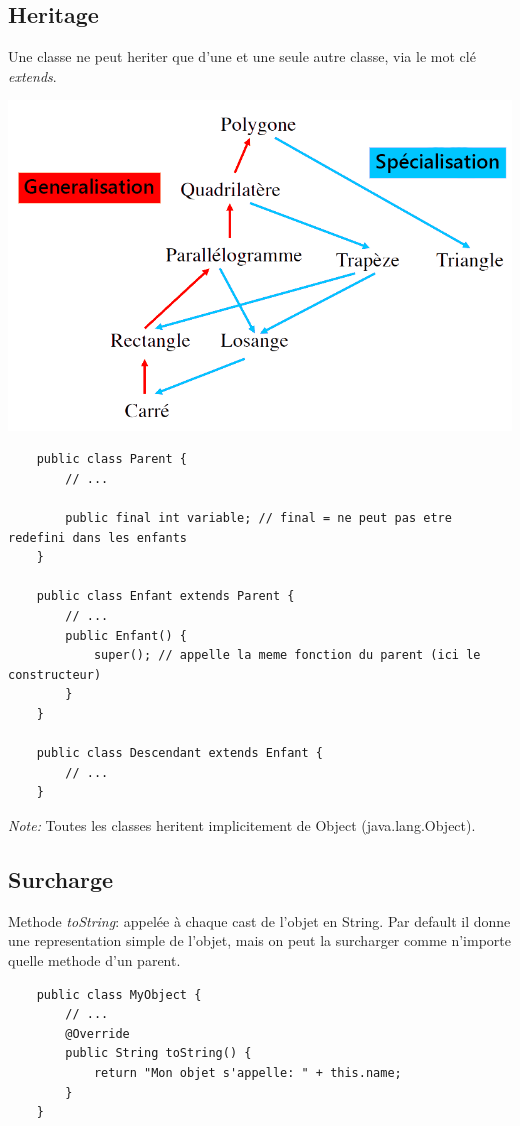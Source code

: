\documentclass[a4paper, 12pt, french]{article}
\begin{document}
	\subsection{Heritage}

	Une classe ne peut heriter que d'une et une seule autre classe, via le mot clé \emph{extends}.

	\includegraphics[width=13.8cm]{java_00_heritage}

	\begin{lstlisting}
	public class Parent {
		// ...

		public final int variable; // final = ne peut pas etre redefini dans les enfants
	}

	public class Enfant extends Parent {
		// ...
		public Enfant() {
			super(); // appelle la meme fonction du parent (ici le constructeur)
		}
	}

	public class Descendant extends Enfant {
		// ...
	}
	\end{lstlisting}

	\emph{Note:} Toutes les classes heritent implicitement de Object (java.lang.Object).\\

	\subsection{Surcharge}

	Methode \emph{toString}: appelée à chaque cast de l'objet en String. Par default il donne une representation simple de l'objet, mais on peut la surcharger comme n'importe quelle methode d'un parent.

	\begin{lstlisting}
	public class MyObject {
		// ...
		@Override
		public String toString() {
			return "Mon objet s'appelle: " + this.name;
		}
	}
	\end{lstlisting}
\end{document}
